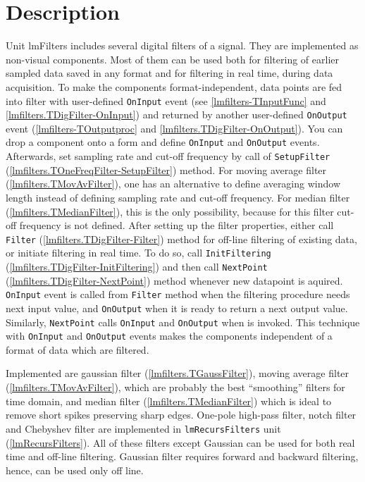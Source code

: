 \documentclass[12pt,a4paper,oneside]{report}
\newcommand{\code}[1]{\texttt{#1}}
\begin{document}
\section{Description}
Unit lmFilters includes several digital filters of a signal. They are implemented as non-visual components. Most of them can be used both for filtering of earlier sampled data saved in any format and for filtering in real time, during data acquisition. To make the components format-independent, data points are fed into filter with user-defined \code{OnInput} event (see \ref{lmfilters-TInputFunc} and \ref{lmfilters.TDigFilter-OnInput}) and returned by another user-defined \code{OnOutput} event (\ref{lmfilters-TOutputproc} and \ref{lmfilters.TDigFilter-OnOutput}). You can drop a component onto a form and define \code{OnInput} and \code{OnOutput} events. Afterwards, set sampling rate and cut-off frequency by call of \code{SetupFilter} (\ref{lmfilters.TOneFreqFilter-SetupFilter}) method. For moving average filter (\ref{lmfilters.TMovAvFilter}), one has an alternative to define averaging window length instead of defining sampling rate and cut-off frequency. For median filter (\ref{lmfilters.TMedianFilter}), this is the only possibility, because for this filter cut-off frequency is not defined. After setting up the filter properties,  either call \code{Filter} (\ref{lmfilters.TDigFilter-Filter}) method for off-line filtering of existing data, or initiate filtering in real time. To do so, call \code{InitFiltering} (\ref{lmfilters.TDigFilter-InitFiltering}) and then call \code{NextPoint} (\ref{lmfilters.TDigFilter-NextPoint}) method whenever new datapoint is aquired. \code{OnInput} event is called from \code{Filter} method when the filtering procedure needs next input value, and \code{OnOutput} when it is ready to return a next output value. Similarly, \code{NextPoint} calls \code{OnInput} and \code{OnOutput} when is invoked. This technique with \code{OnInput} and \code{OnOutput} events makes the components independent of a format of data which are filtered. 

Implemented are gaussian filter (\ref{lmfilters.TGaussFilter}), moving average filter (\ref{lmfilters.TMovAvFilter}), which are probably the best ``smoothing'' filters for time domain, and median filter (\ref{lmfilters.TMedianFilter}) which is ideal to remove short spikes preserving sharp edges. One-pole high-pass filter, notch filter and Chebyshev filter are implemented in \code{lmRecursFilters} unit (\ref{lmRecursFilters}). All of these filters except Gaussian can be used for both real time and off-line filtering. Gaussian filter requires forward and backward filtering, hence, can be used only off line.
\end{document}
